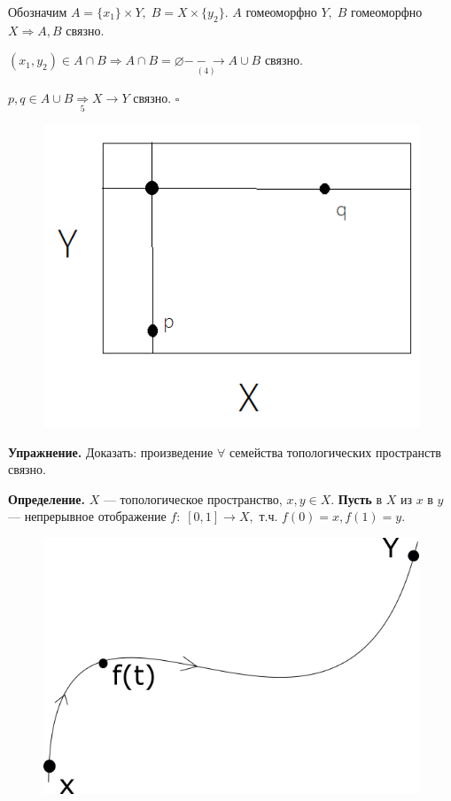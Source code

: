 \documentclass[12pt,a4paper]{article}
\begin{document}
Обозначим $A = \{x_{1}\} \times Y, \; B = X \times \{y_{2}\}.$ $A$ гомеоморфно $Y, \; B$ гомеоморфно $X \Rightarrow A, B$ связно. 

$(x_{1}, y_{2}) \in A \cap B \Rightarrow A \cap B = \varnothing \underset{(4)}{--\!\!\to} A \cup B$ связно. 

$p, q \in A \cup B \underset{5}{\Rightarrow} X \to Y$ связно. $\square$ 

\begin{figure}
	\includegraphics[width=0.9\linewidth]{lect8_2.png}
\end{figure}

\textbf{Упражнение.} Доказать: произведение $\forall$ семейства топологических пространств связно. 

\textbf{Определение.} $X$ --- топологическое пространство, $x, y \in X.$ \textbf{Пусть} в $X$ из $x$ в $y$ --- непрерывное отображение $f: \; [0, 1] \to X,$ т.ч. $f(0) = x, f(1) = y.$

\begin{figure}
	\includegraphics[width=0.8\linewidth]{lect8_3.png}
\end{figure}
\end{document}
